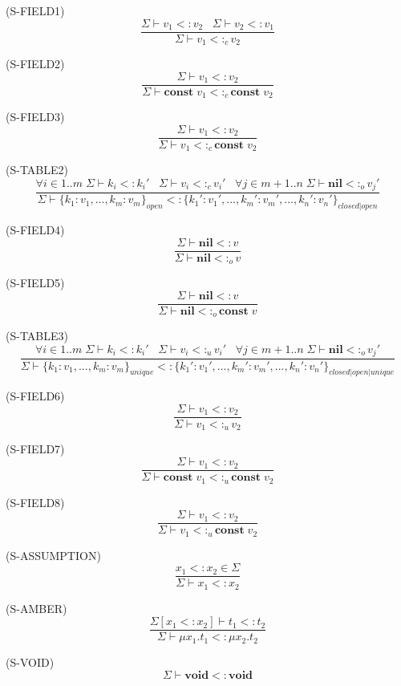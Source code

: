 \documentclass{paper}
\newcommand{\Nil}{\mathbf{nil}}
\newcommand{\Void}{\mathbf{void}}
\newcommand{\Const}{\mathbf{const}}
\newcommand{\mylabel}[1]{\; (\textsc{#1})}
\newcommand{\senv}{\Sigma}
\newcommand{\subtype}{<:}
\begin{document}
\mylabel{S-FIELD1}
\[
\dfrac{\senv \vdash v_{1} \subtype v_{2} \;\;\;
       \senv \vdash v_{2} \subtype v_{1}}
      {\senv \vdash v_{1} \subtype_{c} v_{2}}
\]

\mylabel{S-FIELD2}
\[
\dfrac{\senv \vdash v_{1} \subtype v_{2}}
      {\senv \vdash \Const \; v_{1} \subtype_{c} \Const \; v_{2}}
\]

\mylabel{S-FIELD3}
\[
\dfrac{\senv \vdash v_{1} \subtype v_{2}}
      {\senv \vdash v_{1} \subtype_{c} \Const \; v_{2}}
\]

\mylabel{S-TABLE2}
\[
\dfrac{\forall i \in 1..m \; \senv \vdash k_{i} \subtype k_{i}' \;\;\;
       \senv \vdash v_{i} \subtype_{c} v_{i}' \;\;\;
       \forall j \in m+1..n \; \senv \vdash \Nil \subtype_{o} v_{j}'}
      {\senv \vdash \{k_{1}{:}v_{1}, ..., k_{m}{:}v_{m}\}_{open} \subtype
                    \{k_{1}'{:}v_{1}', ..., k_{m}'{:}v_{m}', ..., k_{n}'{:}v_{n}'\}_{closed|open}}
\]

\mylabel{S-FIELD4}
\[
\dfrac{\senv \vdash \Nil \subtype v}
      {\senv \vdash \Nil \subtype_{o} v}
\]

\mylabel{S-FIELD5}
\[
\dfrac{\senv \vdash \Nil \subtype v}
      {\senv \vdash \Nil \subtype_{o} \Const \; v}
\]

\mylabel{S-TABLE3}
\[
\dfrac{\forall i \in 1..m \; \senv \vdash k_{i} \subtype k_{i}' \;\;\;
       \senv \vdash v_{i} \subtype_{u} v_{i}' \;\;\;
       \forall j \in m+1..n \; \senv \vdash \Nil \subtype_{o} v_{j}'}
      {\senv \vdash \{k_{1}{:}v_{1}, ..., k_{m}{:}v_{m}\}_{unique} \subtype
                    \{k_{1}'{:}v_{1}', ..., k_{m}'{:}v_{m}', ..., k_{n}'{:}v_{n}'\}_{closed|open|unique}}
\]

\mylabel{S-FIELD6}
\[
\dfrac{\senv \vdash v_{1} \subtype v_{2}}
      {\senv \vdash v_{1} \subtype_{u} v_{2}}
\]

\mylabel{S-FIELD7}
\[
\dfrac{\senv \vdash v_{1} \subtype v_{2}}
      {\senv \vdash \Const \; v_{1} \subtype_{u} \Const \; v_{2}}
\]

\mylabel{S-FIELD8}
\[
\dfrac{\senv \vdash v_{1} \subtype v_{2}}
      {\senv \vdash v_{1} \subtype_{u} \Const \; v_{2}}
\]

\mylabel{S-ASSUMPTION}
\[
\dfrac{x_{1} \subtype x_{2} \in \senv}
      {\senv \vdash x_{1} \subtype x_{2}}
\]

\mylabel{S-AMBER}
\[
\dfrac{\senv[x_{1} \subtype x_{2}] \vdash t_{1} \subtype t_{2}}
      {\senv \vdash \mu x_{1}.t_{1} \subtype \mu x_{2}.t_{2}}
\]

\mylabel{S-VOID}
\[
\senv \vdash \Void \subtype \Void
\]
\end{document}
